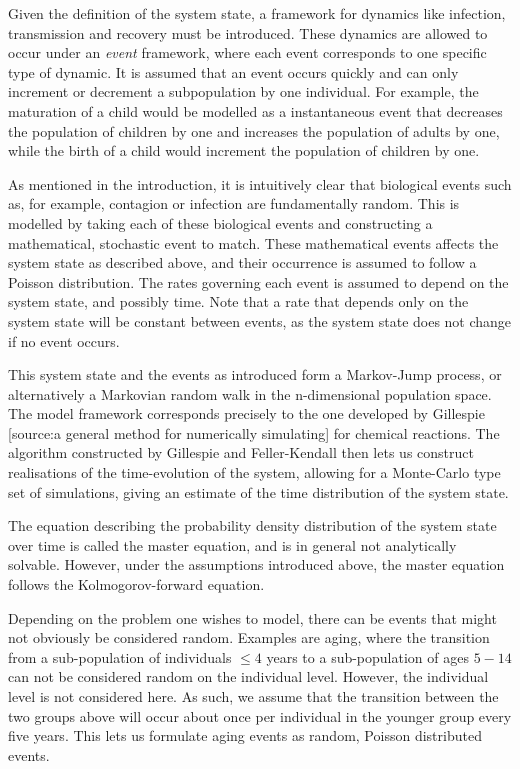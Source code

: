 \documentclass[10pt,a4paper]{article}
\begin{document}
Given the definition of the system state, a framework for dynamics like infection, transmission and recovery must be introduced. These dynamics are allowed to occur under an \emph{event} framework, where each event corresponds to one specific type of dynamic. It is assumed that an event occurs quickly and can only increment or decrement a subpopulation by one individual. For example, the maturation of a child would be modelled as a instantaneous event that decreases the population of children by one and increases the population of adults by one, while the birth of a child would increment the population of children by one.

As mentioned in the introduction, it is intuitively clear that biological events such as, for example, contagion or infection are fundamentally random. This is modelled by taking each of these biological events and constructing a mathematical, stochastic event to match. These mathematical events affects the system state as described above, and their occurrence is assumed to follow a Poisson distribution. The rates governing each event is assumed to depend on the system state, and possibly time. Note that a rate that depends only on the system state will be constant between events, as the system state does not change if no event occurs.

This system state and the events as introduced form a Markov-Jump process, or alternatively a Markovian random walk in the n-dimensional population space. The model framework corresponds precisely to the one developed by Gillespie [source:a general method for numerically simulating] for chemical reactions. The algorithm constructed by Gillespie and Feller-Kendall then lets us construct realisations of the time-evolution of the system, allowing for a Monte-Carlo type set of simulations, giving an estimate of the time distribution of the system state.

The equation describing the probability density distribution of the system state over time is called the master equation, and is in general not analytically solvable. However, under the assumptions introduced above, the master equation follows the Kolmogorov-forward equation.

Depending on the problem one wishes to model, there can be events that might not obviously be considered random. Examples are aging, where the transition from a sub-population of individuals $\leq 4$ years to a sub-population of ages $5-14$ can not be considered random on the individual level. However, the individual level is not considered here. As such, we assume that the transition between the two groups above will occur about once per individual in the younger group every five years. This lets us formulate aging events as random, Poisson distributed events.
\end{document}
